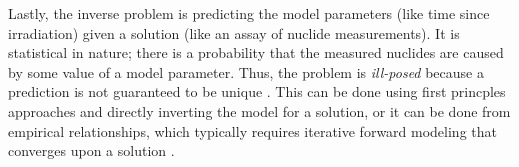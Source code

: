 Lastly, the inverse problem is predicting the model parameters (like time since
irradiation) given a solution (like an assay of nuclide measurements).  It is
statistical in nature; there is a probability that the measured nuclides are
caused by some value of a model parameter. Thus, the problem is
\textit{ill-posed} because a prediction is not guaranteed to be unique
\cite{skutnik_2016}. This can be done using first princples approaches and
directly inverting the model for a solution, or it can be done from empirical
relationships, which typically requires iterative forward modeling that
converges upon a solution \cite{inverse_select, inverse_compare}.


\cite{grogan_sensitivity1, grogan_sensitivity2, grogan_indepth_2018}
\cite{weber_2006, weber_2010, weber_2011}

%


